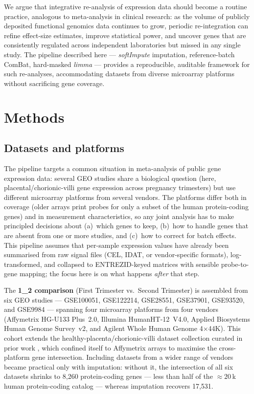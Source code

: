 \documentclass[11pt,a4paper]{article}
\begin{document}
We argue that integrative re-analysis of expression data should
become a routine practice, analogous to meta-analysis in
clinical research: as the volume of publicly deposited
functional genomics data continues to grow, periodic
re-integration can refine effect-size estimates, improve
statistical power, and uncover genes that are consistently
regulated across independent laboratories but missed in any
single study. The pipeline described here --- \textit{softImpute}
imputation, reference-batch ComBat, hard-masked \textit{limma}
--- provides a reproducible, auditable framework for such
re-analyses, accommodating datasets from diverse microarray
platforms without sacrificing gene coverage.

\section{Methods}

\subsection{Datasets and platforms}
\label{sec:platforms}

The pipeline targets a common situation in meta-analysis of
public gene expression data: several GEO studies share a
biological question (here, placental/chorionic-villi gene
expression across pregnancy trimesters) but use different microarray platforms
from several vendors. The platforms differ both in coverage
(older arrays print probes for only a subset of the human
protein-coding genes) and in measurement characteristics, so
any joint analysis has to make principled decisions about
(a)~which genes to keep, (b)~how to handle genes that are
absent from one or more studies, and (c)~how to correct for
batch effects. This pipeline assumes that per-sample expression
values have already been summarised from raw signal files (CEL,
IDAT, or vendor-specific formats), log-transformed, and
collapsed to ENTREZID-keyed matrices with sensible
probe-to-gene mapping; the focus here is on what happens
\emph{after} that step.

The \textbf{1\_2 comparison} (First Trimester vs.~Second
Trimester) is assembled from six GEO studies --- GSE100051,
GSE122214, GSE28551, GSE37901, GSE93520, and GSE9984
--- spanning four microarray platforms from four vendors
(Affymetrix HG-U133 Plus~2.0, Illumina HumanHT-12~V4.0,
Applied Biosystems Human Genome Survey~v2, and Agilent Whole
Human Genome 4$\times$44K). This cohort extends the healthy-placenta/chorionic-villi dataset collection
curated in prior work
\citep{Lykhenko2021a,Lykhenko2021b}, which confined itself to
Affymetrix arrays to maximise the cross-platform gene
intersection. Including datasets from a wider range of vendors
became practical only with imputation: without it, the
intersection of all six datasets shrinks to 8{,}260
protein-coding genes --- less than half of the
$\approx\!20$\,k human protein-coding catalog --- whereas
imputation recovers 17{,}531.
\end{document}
